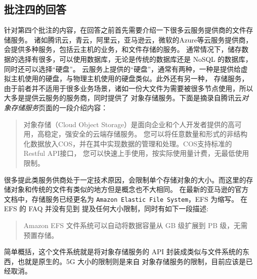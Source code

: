 
\subsection{批注四的回答}
\label{sec:fix:bl4}

针对第四个批注的内容，在回答之前首先需要介绍一下很多云服务提供商的文件存储服务。
诸如腾讯云，青云，阿里云，亚马逊云，微软的Azure等云服务提供商，会提供多种服务，包括云主机的业务，和文件存储的服务。
通常情况下，储存数据的选择有很多，可以使用数据库，无论是传统的数据库还是 NoSQL 的数据库，同时还可以选择“硬盘”。
云服务上提供的“硬盘”，通常有两种，一种是提供给虚拟主机使用的硬盘，与物理主机使用的硬盘类似。此外还有另一种，
存储服务，由于前者并不适用于很多业务场景，诸如一份大文件为需要被很多节点使用，所以大多是提供云服务的服务商，同时提供了
对象存储服务。下面是摘录自腾讯云\textit{对象存储服务}页面的一段介绍内容：
\begin{quote}
    对象存储（Cloud Object Storage）是面向企业和个人开发者提供的高可用，高稳定，强安全的云端存储服务。
    您可以将任意数量和形式的非结构化数据放入COS，并在其中实现数据的管理和处理。COS支持标准的Restful API接口，
    您可以快速上手使用，按实际使用量计费，无最低使用限制。
\end{quote}
很多提此类服务供商处于一定技术原因，会限制单个存储对象的大小。而这里的存储对象和传统的文件有类似的地方但是概念也不大相同。
在最新的亚马逊的官方文档中，存储服务已经更名为 \verb|Amazon Elastic File System|，EFS 为缩写。 在 EFS 的 FAQ 并没有见到
提及任何大小限制，同时有如下一段描述:
\begin{quote}
    Amazon EFS 文件系统可以自动将数据容量从 GB 级扩展到 PB 级，无需预置存储。
\end{quote}

简单概括，这个文件系统就是将对象存储服务的 API 封装成类似与文件系统的东西，也就是原生的。5G 大小的限制则是来自
对象存储服务的限制，目前应该是已经取消。